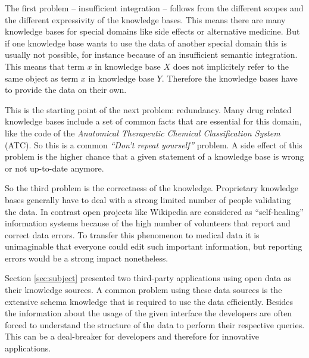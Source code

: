 The first problem -- insufficient integration -- follows from the different scopes and the different expressivity of the knowledge bases.
This means there are many knowledge bases for special domains like side effects or alternative medicine.
But if one knowledge base wants to use the data of another special domain this is usually not possible, for instance because of an insufficient semantic integration.
This means that term $x$ in knowledge base $X$ does not implicitely refer to the same object as term $x$ in knowledge base $Y$.
Therefore the knowledge bases have to provide the data on their own.

This is the starting point of the next problem: redundancy.
Many drug related knowledge bases include a set of common facts that are essential for this domain, like the code of the \textit{Anatomical Therapeutic Chemical Classification System} (ATC).
So this is a common \textit{``Don't repeat yourself''} problem.
A side effect of this problem is the higher chance that a given statement of a knowledge base is wrong or not up-to-date anymore.

So the third problem is the correctness of the knowledge.
Proprietary knowledge bases generally have to deal with a strong limited number of people validating the data.
In contrast open projects like Wikipedia are considered as ``self-healing'' information systems because of the high number of volunteers that report and correct data errors.
To transfer this phenomenon to medical data it is unimaginable that everyone could edit such important information, but reporting errors would be a strong impact nonetheless.

Section \ref{sec:subject} presented two third-party applications using open data as their knowledge sources.
A common problem using these data sources is the extensive schema knowledge that is required to use the data efficiently. 
Besides the information about the usage of the given interface the developers are often forced to understand the structure of the data to perform their respective queries.
This can be a deal-breaker for developers and therefore for innovative applications.

